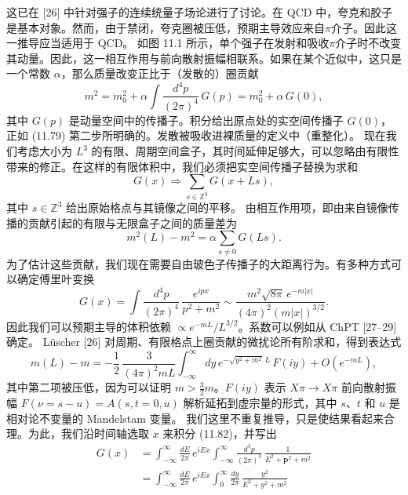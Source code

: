 这已在 [26] 中针对强子的连续统量子场论进行了讨论。在 QCD 中，夸克和胶子是基本对象。然而，由于禁闭，夸克圈被压低，预期主导效应来自$\pi$介子。因此这一推导应当适用于 QCD。
如图 11.1 所示，单个强子在发射和吸收$\pi$介子时不改变其动量。因此，这一相互作用与前向散射振幅相联系。如果在某个近似中，这只是一个常数 $\alpha$，那么质量改变正比于（发散的）圈贡献
\begin{equation}
m^2 = m_0^2 + \alpha \int \frac{d^4p}{(2\pi)^4}\, G(p) = m_0^2 + \alpha\, G(0) ,
\end{equation}
其中 $G(p)$ 是动量空间中的传播子。积分给出原点处的实空间传播子 $G(0)$，正如 (11.79) 第二步所明确的。发散被吸收进裸质量的定义中（重整化）。
现在我们考虑大小为 $L^3$ 的有限、周期空间盒子，其时间延伸足够大，可以忽略由有限性带来的修正。在这样的有限体积中，我们必须把实空间传播子替换为求和
\begin{equation}
G(x) \Rightarrow \sum_{s \in \mathbb{Z}^3} G(x + L s) ,
\end{equation}
其中 $s \in \mathbb{Z}^3$ 给出原始格点与其镜像之间的平移。
由相互作用项，即由来自镜像传播的贡献引起的有限与无限盒子之间的质量差为
\begin{equation}
m^2(L) - m^2 = \alpha \sum_{s \neq 0} G(L s) .
\end{equation}
为了估计这些贡献，我们现在需要自由玻色子传播子的大距离行为。有多种方式可以确定傅里叶变换
\begin{equation}
G(x) = \int \frac{d^4p}{(2\pi)^4}\, \frac{e^{ipx}}{p^2 + m^2}
\sim \frac{m^2 \sqrt{8\pi}\, e^{-m|x|}}{(4\pi)^2 (m|x|)^{3/2}} .
\end{equation}
因此我们可以预期主导的体积依赖 $\propto e^{-mL}/L^{3/2}$。系数可以例如从 ChPT [27--29] 确定。
Lüscher [26] 对周期、有限格点上圈贡献的微扰论所有阶求和，得到表达式
\begin{equation}
m(L) - m = -\frac{1}{2}\,\frac{3}{(4\pi)^2 mL}
\int_{-\infty}^{\infty} dy\, e^{-\sqrt{y^2 + m^2}\, L}\, F(iy) + O(e^{-mL}) ,
\end{equation}
其中第二项被压低，因为可以证明 $m > \tfrac{3}{2}m$。$F(iy)$ 表示 $X\pi \to X\pi$ 前向散射振幅 $F(\nu = s - u) = A(s, t = 0, u)$ 解析延拓到虚宗量的形式，其中 $s$、$t$ 和 $u$ 是相对论不变量的 Mandelstam 变量。
我们这里不重复推导，只是使结果看起来合理。为此，我们沿时间轴选取 $x$ 来积分 (11.82)，并写出
\begin{equation}
\begin{aligned}
G(x) &= \int_{-\infty}^{\infty} \frac{dE}{2\pi}\, e^{iEx}
\int_{-\infty}^{\infty} \frac{d^3p}{(2\pi)^3}\, \frac{1}{E^2 + \mathbf{p}^2 + m^2} \\
&= \int_{-\infty}^{\infty} \frac{dE}{2\pi}\, e^{iEx}
\int_0^{\infty} \frac{dy}{2\pi}\, \frac{y^2}{E^2 + y^2 + m^2}
\end{aligned}
\end{equation}
